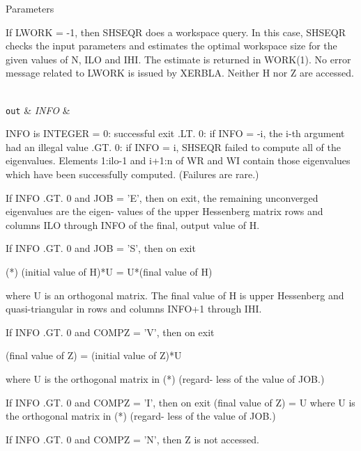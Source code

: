 \begin{DoxyParams}[1]{Parameters}
\begin{DoxyVerb}
           If LWORK = -1, then SHSEQR does a workspace query.
           In this case, SHSEQR checks the input parameters and
           estimates the optimal workspace size for the given
           values of N, ILO and IHI.  The estimate is returned
           in WORK(1).  No error message related to LWORK is
           issued by XERBLA.  Neither H nor Z are accessed.\end{DoxyVerb}
\\
\hline
\mbox{\tt out}  & {\em I\+N\+F\+O} & \begin{DoxyVerb}          INFO is INTEGER
             =  0:  successful exit
           .LT. 0:  if INFO = -i, the i-th argument had an illegal
                    value
           .GT. 0:  if INFO = i, SHSEQR failed to compute all of
                the eigenvalues.  Elements 1:ilo-1 and i+1:n of WR
                and WI contain those eigenvalues which have been
                successfully computed.  (Failures are rare.)

                If INFO .GT. 0 and JOB = 'E', then on exit, the
                remaining unconverged eigenvalues are the eigen-
                values of the upper Hessenberg matrix rows and
                columns ILO through INFO of the final, output
                value of H.

                If INFO .GT. 0 and JOB   = 'S', then on exit

           (*)  (initial value of H)*U  = U*(final value of H)

                where U is an orthogonal matrix.  The final
                value of H is upper Hessenberg and quasi-triangular
                in rows and columns INFO+1 through IHI.

                If INFO .GT. 0 and COMPZ = 'V', then on exit

                  (final value of Z)  =  (initial value of Z)*U

                where U is the orthogonal matrix in (*) (regard-
                less of the value of JOB.)

                If INFO .GT. 0 and COMPZ = 'I', then on exit
                      (final value of Z)  = U
                where U is the orthogonal matrix in (*) (regard-
                less of the value of JOB.)

                If INFO .GT. 0 and COMPZ = 'N', then Z is not
                accessed.\end{DoxyVerb}
 \\
\hline
\end{DoxyParams}
